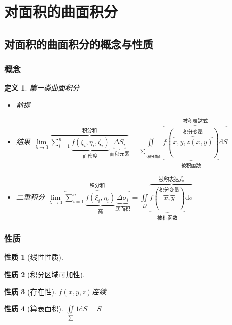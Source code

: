\documentclass[UTF8,a4paper,12pt,scheme=chinese]{ctexbook}
\newcommand{\ud}{\mathrm{d}}
\theoremstyle{plain}
\newtheorem{definition}{定义}[section]
\newtheorem{property}{性质}[subsection]
\begin{document}
	\section{对面积的曲面积分}
	\subsection{对面积的曲面积分的概念与性质}
	\subsubsection{概念}
	\begin{definition}
		第一类曲面积分
		\begin{itemize}
			\item 前提
			\item 结果\quad
			$ \lim\limits_{\lambda\rightarrow 0}
			\overbrace{\sum_{i=1}^{n}
				\underbrace{f(\xi_i,\eta_i,\zeta _i)}
				_{\mbox{面密度}}
				\underbrace{\Delta S_i}
				_{\mbox{面积元素}}}
			^{\mbox{积分和}}
			=\iint\limits_{
				\underbrace{\scriptstyle\sum}
				_{\mbox{积分曲面}}
			}
			\overbrace{
				\underbrace{f(
					\overbrace{x,y,z(x,y)}
					^{\mbox{积分变量}}
					)}
				_{\mbox{被积函数}}
				\ud S}
			^{\mbox{被积表达式}}
			$
			\item 二重积分\quad
			$ \lim\limits_{\lambda\rightarrow 0}
			\overbrace{\sum_{i=1}^{n}
				\underbrace{f(\xi_i,\eta_i)}
				_{\mbox{高}}
				\underbrace{\Delta\sigma_i}
				_{\mbox{底面积}}}
			^{\mbox{积分和}}
			=\iint\limits_{D}
			\overbrace{
				\underbrace{f(
					\overbrace{x,y}
					^{\mbox{积分变量}}
					)}
				_{\mbox{被积函数}}
				\ud\sigma}
			^{\mbox{被积表达式}}
			$
		\end{itemize}
	\end{definition}
	\subsubsection{性质}
	\begin{property}[线性性质]
	\end{property}
	\begin{property}[积分区域可加性]
	\end{property}
	\begin{property}[存在性]
		$ f(x,y,z) $连续
	\end{property}
	\begin{property}[算表面积]
		$\iint\limits_{\sum } 1\ud S =S$
	\end{property}
\end{document}
